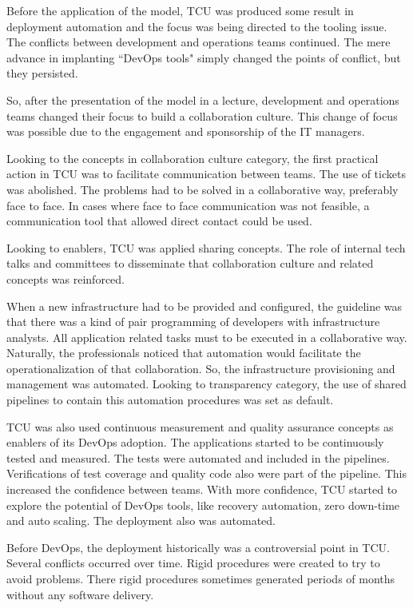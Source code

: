 Before the application of the model, TCU was produced some result in deployment
automation and the focus was being directed to the tooling issue. The conflicts
between development and operations teams continued. The mere advance in
implanting ``DevOps tools" simply changed the points of conflict, but they
persisted.

So, after the presentation of the model in a lecture, development and
operations teams changed their focus to build a collaboration culture. This
change of focus was possible due to the engagement and sponsorship of the IT
managers.

Looking to the concepts in collaboration culture category, the first practical
action in TCU was to facilitate communication between teams. The use of tickets
was abolished. The problems had to be solved in a collaborative way, preferably
face to face. In cases where face to face communication was not feasible, a
communication tool that allowed direct contact could be used.

Looking to enablers, TCU was applied sharing concepts. The role of internal
tech talks and committees to disseminate that collaboration culture and related
concepts was reinforced.

When a new infrastructure had to be provided and configured, the guideline was
that there was a kind of pair programming of developers with infrastructure
analysts. All application related tasks must to be executed in a collaborative
way. Naturally, the professionals noticed that automation would facilitate the
operationalization of that collaboration. So, the infrastructure provisioning
and management was automated. Looking to transparency category, the use of
shared pipelines to contain this automation procedures was set as default.

TCU was also used continuous measurement and quality assurance concepts as
enablers of its DevOps adoption. The applications started to be continuously
tested and measured. The tests were automated and included in the pipelines.
Verifications of test coverage and quality code also were part of the pipeline.
This increased the confidence between teams. With more confidence, TCU started
to explore the potential of DevOps tools, like recovery automation, zero
down-time and auto scaling. The deployment also was automated.

Before DevOps, the deployment historically was a controversial point in TCU.
Several conflicts occurred over time. Rigid procedures were created to try to
avoid problems. There rigid procedures sometimes generated periods of months
without any software delivery.

